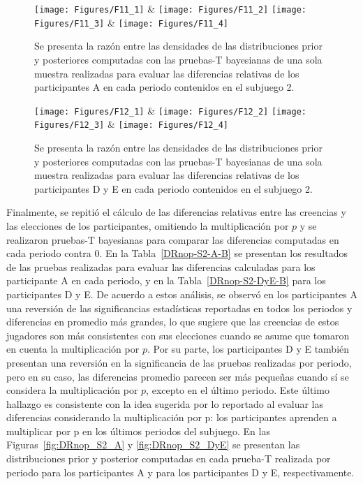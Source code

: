 \begin{figure}[hp]
\centering
\texttt{[image: Figures/F11\_1]} & \texttt{[image: Figures/F11\_2]} 
\texttt{[image: Figures/F11\_3]} & \texttt{[image: Figures/F11\_4]} 
\decoRule
\caption[Evaluación de las Diferencias Relativas entre creencias y elecciones en el Subjuego 1 sin la multiplicación por p (Factor de Bayes)]{Se presenta la razón entre las densidades de las distribuciones prior y posteriores  computadas con las pruebas-T bayesianas de una sola muestra realizadas para evaluar las diferencias relativas de los participantes A en cada periodo contenidos en el subjuego 2.}
\label{fig:DR_S2_A}
\end{figure}  


\begin{figure}[hp]
\centering
\texttt{[image: Figures/F12\_1]} & \texttt{[image: Figures/F12\_2]} 
\texttt{[image: Figures/F12\_3]} & \texttt{[image: Figures/F12\_4]} 
\decoRule
\caption[Evaluación de las Diferencias Relativas entre creencias y elecciones en el Subjuego 1 sin la multiplicación por p (Factor de Bayes)]{Se presenta la razón entre las densidades de las distribuciones prior y posteriores  computadas con las pruebas-T bayesianas de una sola muestra realizadas para evaluar las diferencias relativas de los participantes D y E en cada periodo contenidos en el subjuego 2.}
\label{fig:DR_S2_DyE}
\end{figure}  


Finalmente, se repitió el cálculo de las diferencias relativas entre las creencias y las elecciones de los participantes, omitiendo la multiplicación por $p$ y se realizaron pruebas-T bayesianas para comparar las diferencias computadas en cada periodo contra 0. En la Tabla~\ref{DRnop-S2-A-B} se presentan los resultados de las pruebas realizadas para evaluar las diferencias calculadas para los participante A en cada periodo, y en la Tabla~\ref{DRnop-S2-DyE-B} para los participantes D y E. De acuerdo a estos análisis, se observó  en los participantes A una reversión de las significancias estadísticas reportadas en todos los periodos y diferencias en promedio más grandes, lo que sugiere que las creencias de estos jugadores son más consistentes con sus elecciones cuando se asume que tomaron en cuenta la multiplicación por $p$. Por su parte, los participantes D y E también presentan una reversión en la significancia de las pruebas realizadas por periodo, pero en su caso, las diferencias promedio parecen ser más pequeñas cuando sí se considera la multiplicación por $p$, excepto en el último periodo. Este último hallazgo es consistente con la idea sugerida por lo reportado al evaluar las diferencias considerando la multiplicación por p: los participantes aprenden a multiplicar por p en los últimos periodos del subjuego. En las Figuras~\ref{fig:DRnop_S2_A} y \ref{fig:DRnop_S2_DyE} se presentan las distribuciones prior y posterior computadas en cada prueba-T realizada por periodo para los  participantes A y para los participantes D y E, respectivamente.\\



